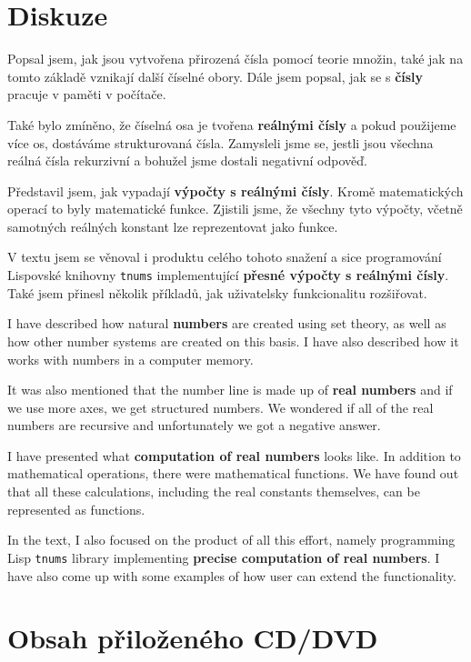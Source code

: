 \documentclass[
master=false,
field=inf,
encoding=utf8,
language=czech,
printversion=true,]{kidiplom}
\begin{document}
\section{Diskuze}

\begin{kiconclusions}
Popsal jsem, jak jsou vytvořena přirozená čísla pomocí teorie množin, také jak na tomto základě vznikají další číselné obory. Dále jsem popsal, jak se s \textbf{čísly} pracuje v paměti v počítače.

Také bylo zmíněno, že číselná osa je tvořena \textbf{reálnými čísly} a pokud použijeme více os, dostáváme strukturovaná čísla. Zamysleli jsme se, jestli jsou všechna reálná čísla rekurzivní a bohužel jsme dostali negativní odpověď.

Představil jsem, jak vypadají \textbf{výpočty s reálnými čísly}. Kromě matematických operací to byly matematické funkce. Zjistili jsme, že všechny tyto výpočty, včetně samotných reálných konstant lze reprezentovat jako funkce.

V textu jsem se věnoval i produktu celého tohoto snažení a sice programování Lispovské knihovny \texttt{tnums} implementující \textbf{přesné výpočty s reálnými čísly}. Také jsem přinesl několik příkladů, jak uživatelsky funkcionalitu rozšiřovat.
\end{kiconclusions}
\begin{kiconclusions}[english]
I have described how natural \textbf{numbers} are created using set theory, as well as how other number systems are created on this basis. I have also described how it works with numbers in a computer memory.

It was also mentioned that the number line is made up of \textbf{real numbers} and if we use more axes, we get structured numbers. We wondered if all of the real numbers are recursive and unfortunately we got a negative answer.

I have presented what \textbf{computation of real numbers} looks like. In addition to mathematical operations, there were mathematical functions. We have found out that all these calculations, including the real constants themselves, can be represented as functions.

In the text, I also focused on the product of all this effort, namely programming Lisp \texttt{tnums} library implementing \textbf{precise computation of real numbers}. I have also come up with some examples of how user can extend the functionality.
\end{kiconclusions}
\clearpage
\printbibliography[heading=bibintoc, title={Seznam literatury}]
\appendix
\section{Obsah přiloženého CD/DVD}\label{pril:adresar}

\end{document}
